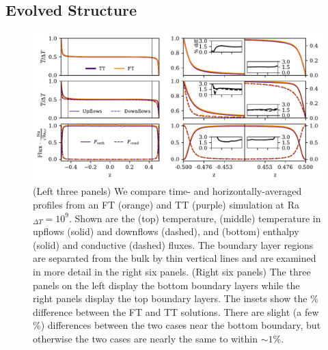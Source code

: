 \documentclass[aps, pre, onecolumn, nofootinbib, notitlepage, groupedaddress, amsfonts, amssymb, amsmath, longbibliography, superscriptaddress]{revtex4-1}
\newcommand{\ea}[1]{{\color{red} #1}}
\begin{document}
\subsection{Evolved Structure}
\begin{figure}
\includegraphics[width=\textwidth]{./figs/rbc_1D_profiles.pdf}
\caption{ 
	(Left three panels) We compare time- and horizontally-averaged profiles from an FT (orange) and TT (purple) simulation at Ra$_{\Delta T} = 10^{9}$.
	Shown are the (top) temperature, (middle) temperature in upflows (solid) and downflows (dashed), and (bottom) enthalpy (solid) and conductive (dashed) fluxes.
	The boundary layer regions are separated from the bulk by thin vertical lines and are examined in more detail in the right six panels.
	(Right six panels) The three panels on the left \ea{display} the bottom boundary layers while the right panels \ea{display} the top boundary layers.
	The insets show the \% difference between the FT and TT solutions.
	There are slight (a few \%) differences between the two cases near the bottom boundary, but otherwise the two cases are nearly the same to within $\sim 1$\%.
\label{fig:rbc_1D_profiles} }
\vspace{0.5cm}
\end{figure}
\end{document}
